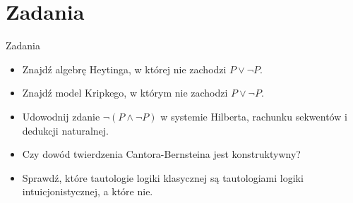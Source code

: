 \documentclass{beamer}
\begin{document}
\section{Zadania}

\begin{frame}{Zadania}
\begin{itemize}
	\item Znajdź algebrę Heytinga, w której nie zachodzi $P \lor \neg P$.
	\item Znajdź model Kripkego, w którym nie zachodzi $P \lor \neg P$.
	\item Udowodnij zdanie $\neg (P \land \neg P)$ w systemie Hilberta, rachunku sekwentów i dedukcji naturalnej.
	\item Czy dowód twierdzenia Cantora-Bernsteina jest konstruktywny?
	\item Sprawdź, które tautologie logiki klasycznej są tautologiami logiki intuicjonistycznej, a które nie.
\end{itemize}
\end{frame}
\end{document}
